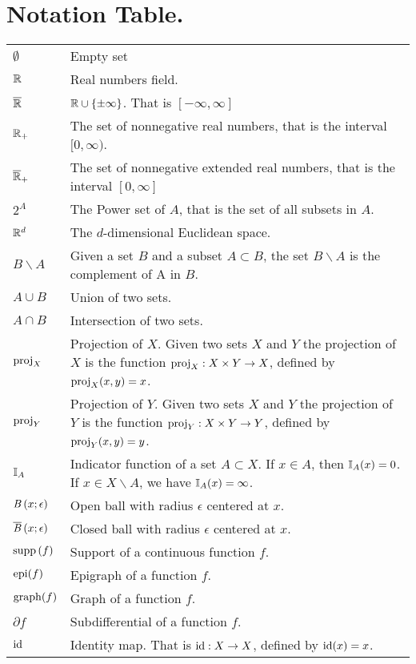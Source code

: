 \chapter*{Notation Table.}
\begin{longtable*}{ p{0.1\textwidth} p{0.8\textwidth} }
	$\emptyset$ & Empty set \\
	$\mathbb{R}$ & Real numbers field. \\ 
	$\overline{\mathbb{R}}$ & $ \mathbb{R} \cup \left\lbrace \pm\infty \right\rbrace$. That is $[-\infty, \infty]$ \\
	$\mathbb{R}_+ $ & The set of nonnegative real numbers, that is the interval $[0, \infty)$.\\
	$\overline{\mathbb{R}}_+$ & The set of nonnegative extended real numbers, that is the interval $[0, \infty]$\\
	$2^A$ & The Power set of $A$, that is the set of all subsets in $A$.\\
	$\mathbb{R}^d $ & The $d$-dimensional Euclidean space.\\
	$B\backslash A$ & Given a set $B$ and a subset $A\subset B$, the set $B\backslash A$ is the complement of A in $B$.\\
	$A\cup B$ & Union of two sets.\\
	$A\cap B$ & Intersection of two sets.\\
	$\mathrm{proj}_X$& Projection of $X$. Given two sets $X$ and $Y$ the projection of $X$ is the function $\mathrm{proj}_X:X\times Y\rightarrow X$, defined by $\mathrm{proj}_X(x,y)=x$.\\
	$\mathrm{proj}_Y$& Projection of $Y$. Given two sets $X$ and $Y$ the projection of $Y$ is the function $\mathrm{proj}_Y:X\times Y\rightarrow Y$, defined by $\mathrm{proj}_Y(x,y)=y$.\\
	$\mathbb{I}_{A} $ & Indicator function of a set $A\subset X$. If $x\in A$, then $\mathbb{I}_{A}(x)=0$. If $x\in X\backslash A$, we have $\mathbb{I}_{A}(x)=\infty$.\\
	$\mathit{B}\left( x; \epsilon \right)$ & Open ball with radius $\epsilon$ centered at $x$.\\
	$\overline{\mathit{B}}\left( x;\epsilon \right) $ & Closed ball with radius $\epsilon$ centered at $x$.\\
	$\mathrm{supp}\,(f)$ & Support of a continuous function $f$.\\
	$\mathrm{epi}(f)$ & Epigraph of a function $f$.\\
	$\mathrm{graph}(f)$ & Graph of a function $f$. \\
	$\partial f$ & Subdifferential of a function $f$.\\
	$\mathrm{id}$ & Identity map. That is $\mathrm{id}: X\rightarrow X$, defined by $\mathrm{id}(x)=x$.\\

\end{longtable*}
